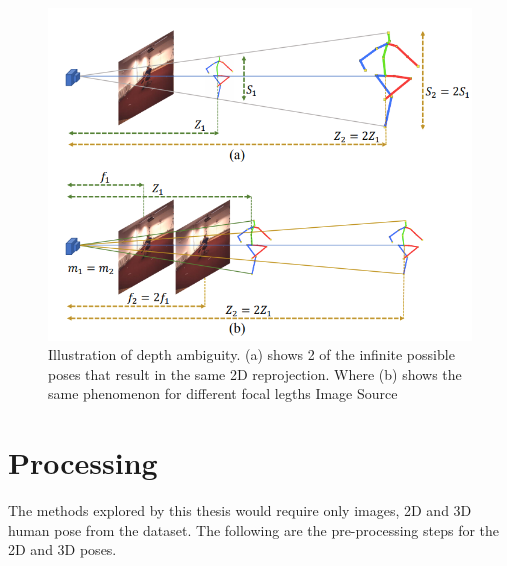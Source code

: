 \begin{figure}[!h]
    \centering
    \includegraphics[scale=0.4]{figures/depthambi.png}
    \caption{Illustration of depth ambiguity. (a) shows 2 of the infinite possible poses that result in the same 2D reprojection. Where (b) shows the same phenomenon for different focal legths
    Image Source \cite{poselifter}}
    \label{fig:depthambi}
\end{figure}










\section{Processing}

The methods explored by this thesis would require only images, 2D and 3D human pose from the dataset. The following are the pre-processing steps for the 2D and 3D poses.



